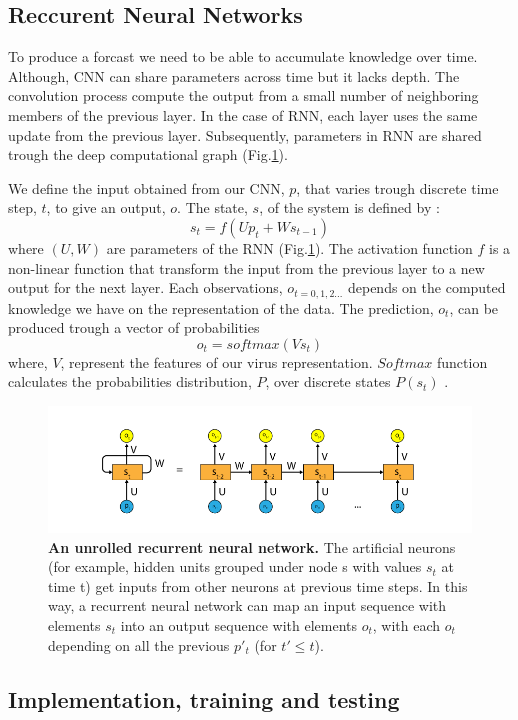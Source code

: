 \documentclass[12pt]{article}
\begin{document}
\subsection{Reccurent Neural Networks}
To produce a forcast we need to be able to accumulate knowledge over time. Although, CNN can share parameters across time but it lacks depth. The convolution process compute the output from a small number of neighboring members of the previous layer. In the case of RNN, each layer uses the same update from the previous layer. Subsequently, parameters in RNN are shared trough the deep computational graph (Fig.\ref{fig:RNN}).

We define the input obtained from our CNN, $p$, that varies trough discrete time step, $t$, to give an output, $o$. The state, $s$, of the system is defined by :
$$s_t = f(Up_t+ Ws_{t-1})$$ where $(U,W)$ are parameters of the RNN (Fig.\ref{fig:RNN}). The activation function $f$ is a non-linear function that transform the input from the previous layer to a new output for the next layer. Each observations, $o_{t=0,1,2 ... }$ depends on the computed knowledge we have on the representation of the data. The prediction, $o_t$, can be produced trough a vector of probabilities  $$o_t=softmax(Vs_t)$$ where, $V$, represent the features of our virus representation. $Softmax$ function calculates the probabilities distribution, $P$, over discrete states $P(s_t)$ .

\begin{figure}[h]
    \centering
    \includegraphics[width=\textwidth]{figure-3.png}
    \caption{ \textbf{An unrolled recurrent neural network.} The artificial neurons (for example, hidden units grouped under node s with values $s_t$ at time t) get inputs from other neurons at previous time steps. In this way, a recurrent neural network can map an input sequence with elements $s_t$ into an output sequence with elements $o_t$, with each $o_t$ depending on all the previous $p'_t$ (for $t'\leq t$). }
    \label{fig:RNN}
\end{figure}

\subsection{Implementation, training and testing}
\end{document}
